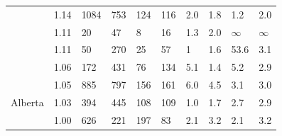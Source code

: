 \documentclass[utf8]{FrontiersinHarvard} %
\begin{document}
\begin{table}[h]
\begin{ssmall}
\begin{tabular}{llllllllll}
			\cite{Yan:2021aa}                & 1.14      & 1084                                 & 753                                     & 124                          & 116                                        & 2.0       & 1.8       & 1.2       & 2.0       \\
			\cite{Chen:2023aa}               & 1.11      & 20                                   & 47                                      & 8                            & 16                                         & 1.3       & 2.0       & $\infty$  & $\infty$  \\
			\cite{Leal:2020aa}               & 1.11      & 50                                   & 270                                     & 25                           & 57                                         & 1         & 1.6       & 53.6      & 3.1       \\
			\cite{Perez-Losada:2017aa}       & 1.06      & 172                                  & 431                                     & 76                           & 134                                        & 5.1       & 1.4       & 5.2       & 2.9       \\
			\cite{liu_dynamics_2020}         & 1.05      & 885                                  & 797                                     & 156                          & 161                                        & 6.0       & 4.5       & 3.1       & 3.0       \\ %
			\cite{chato_public_2020} Alberta & 1.03      & 394                                  & 445                                     & 108                          & 109                                        & 1.0       & 1.7       & 2.7       & 2.9       \\
			\cite{Fabeni:2020aa}             & 1.00      & 626                                  & 221                                     & 197                          & 83                                         & 2.1       & 3.2       & 2.1       & 3.2       \\

			\hline
		\end{tabular}
	\end{ssmall}
\end{table}
\end{document}
